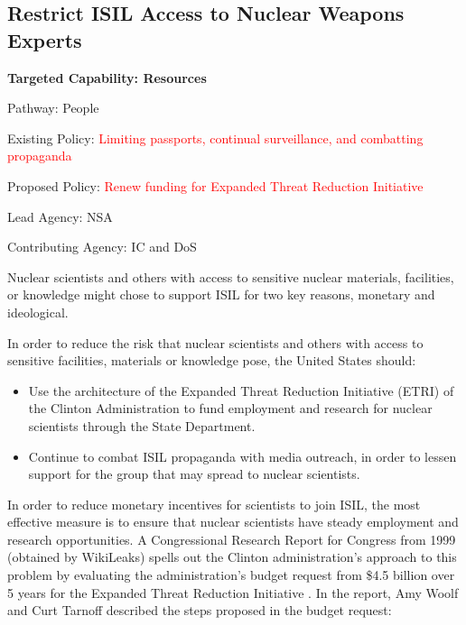 \documentclass{report}
\begin{document}
\subsection{Restrict ISIL Access to Nuclear Weapons Experts}

\bfseries Targeted Capability: Resources 

Pathway: People

Existing Policy: \textcolor{red}{Limiting passports, continual surveillance, and combatting propaganda}

Proposed Policy: \textcolor{red}{Renew funding for Expanded Threat Reduction Initiative}

Lead Agency: NSA

Contributing Agency: IC and DoS \normalfont


Nuclear scientists and others with access to sensitive nuclear materials, facilities, or knowledge might chose to support ISIL for two key reasons, monetary and ideological. 

In order to reduce the risk that nuclear scientists and others with access to sensitive facilities, materials or knowledge pose, the United States should:

\begin{itemize}
 \item Use the architecture of the Expanded Threat Reduction Initiative (ETRI) of the Clinton Administration to fund employment and research for nuclear scientists through the State Department. 
 \item Continue to combat ISIL propaganda with media outreach, in order to lessen support for the group that may spread to nuclear scientists.
\end{itemize}

In order to reduce monetary incentives for scientists to join ISIL, the most effective measure is to ensure that nuclear scientists have steady employment and research opportunities. A Congressional Research Report for Congress from 1999 (obtained by WikiLeaks) spells out the Clinton administration's approach to this problem by evaluating the administration's budget request from \$4.5 billion over 5 years for the Expanded Threat Reduction Initiative  \cite{Woolf1999}. In the report, Amy Woolf and Curt Tarnoff described the steps proposed in the budget request:
\end{document}
